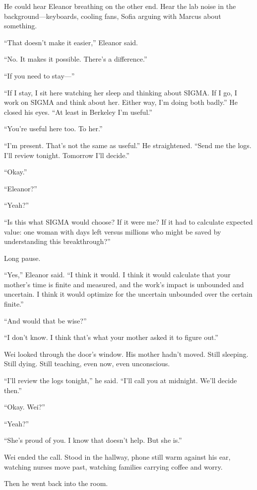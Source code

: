 He could hear Eleanor breathing on the other end. Hear the lab noise in the background---keyboards, cooling fans, Sofia arguing with Marcus about something.

``That doesn't make it easier,'' Eleanor said.

``No. It makes it possible. There's a difference.''

``If you need to stay---''

``If I stay, I sit here watching her sleep and thinking about SIGMA. If I go, I work on SIGMA and think about her. Either way, I'm doing both badly.'' He closed his eyes. ``At least in Berkeley I'm useful.''

``You're useful here too. To her.''

``I'm present. That's not the same as useful.'' He straightened. ``Send me the logs. I'll review tonight. Tomorrow I'll decide.''

``Okay.''

``Eleanor?''

``Yeah?''

``Is this what SIGMA would choose? If it were me? If it had to calculate expected value: one woman with days left versus millions who might be saved by understanding this breakthrough?''

Long pause.

``Yes,'' Eleanor said. ``I think it would. I think it would calculate that your mother's time is finite and measured, and the work's impact is unbounded and uncertain. I think it would optimize for the uncertain unbounded over the certain finite.''

``And would that be wise?''

``I don't know. I think that's what your mother asked it to figure out.''

Wei looked through the door's window. His mother hadn't moved. Still sleeping. Still dying. Still teaching, even now, even unconscious.

``I'll review the logs tonight,'' he said. ``I'll call you at midnight. We'll decide then.''

``Okay. Wei?''

``Yeah?''

``She's proud of you. I know that doesn't help. But she is.''

Wei ended the call. Stood in the hallway, phone still warm against his ear, watching nurses move past, watching families carrying coffee and worry.

Then he went back into the room.


